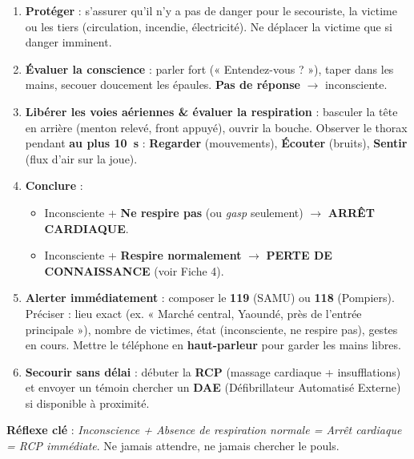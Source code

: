 \documentclass[11pt]{article}
\newcommand{\cle}[1]{{\popxbold\color{popdark}#1}}
\begin{document}
\begin{methode}
\begin{enumerate}
\item \textbf{Protéger} : s'assurer qu'il n'y a pas de danger pour le secouriste, la victime ou les tiers (circulation, incendie, électricité). Ne déplacer la victime que si danger imminent.
\item \textbf{Évaluer la conscience} : parler fort (« Entendez-vous ? »), taper dans les mains, secouer doucement les épaules. \textbf{Pas de réponse} $\rightarrow$ \cle{inconsciente}.
\item \textbf{Libérer les voies aériennes \& évaluer la respiration} : basculer la tête en arrière (menton relevé, front appuyé), ouvrir la bouche. Observer le thorax pendant \textbf{au plus \SI{10}{s}} : \textbf{Regarder} (mouvements), \textbf{Écouter} (bruits), \textbf{Sentir} (flux d'air sur la joue).
\item \textbf{Conclure} :
\begin{itemize}
\item Inconsciente + \textbf{Ne respire pas} (ou \emph{gasp} seulement) $\rightarrow$ \textbf{ARRÊT CARDIAQUE}.
\item Inconsciente + \textbf{Respire normalement} $\rightarrow$ \textbf{PERTE DE CONNAISSANCE} (voir Fiche 4).
\end{itemize}
\item \textbf{Alerter immédiatement} : composer le \textbf{119} (SAMU) ou \textbf{118} (Pompiers). Préciser : lieu exact (ex. « Marché central, Yaoundé, près de l'entrée principale »), nombre de victimes, état (inconsciente, ne respire pas), gestes en cours. Mettre le téléphone en \textbf{haut-parleur} pour garder les mains libres.
\item \textbf{Secourir sans délai} : débuter la \textbf{RCP} (massage cardiaque + insufflations) et envoyer un témoin chercher un \textbf{DAE} (Défibrillateur Automatisé Externe) si disponible à proximité.
\end{enumerate}
\textbf{Réflexe clé} : \emph{Inconscience + Absence de respiration normale = Arrêt cardiaque = RCP immédiate}. Ne jamais attendre, ne jamais chercher le pouls.
\end{methode}
\end{document}
